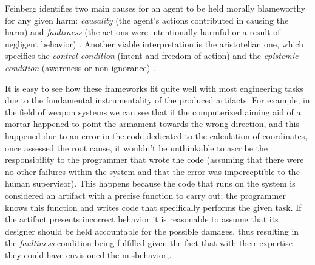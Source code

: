 Feinberg identifies two main causes for an agent to be held morally blameworthy for any given harm: \textit{causality} (the agent's actions contributed in causing the harm) and \textit{faultiness} (the actions were intentionally harmful or a result of negligent behavior) \parencite{FEISC}.
Another viable interpretation is the aristotelian one, which specifies the \textit{control condition} (intent and freedom of action) and the \textit{epistemic condition} (awareness or non-ignorance) \parencite{FISRAC}.

It is easy to see how these frameworks fit quite well with most engineering tasks due to the fundamental instrumentality of the produced artifacts.
For example, in the field of weapon systems we can see that if the computerized aiming aid of a mortar happened to point the armament towards the wrong direction, and this happened due to an error in the code dedicated to the calculation of coordinates, once assessed the root cause, it wouldn't be unthinkable to ascribe the responsibility to the programmer that wrote the code (assuming that there were no other failures within the system and that the error was imperceptible to the human supervisor).
This happens because the code that runs on the system is considered an artifact with a precise function to carry out; the programmer knows this function and writes code that specifically performs the given task.
If the artifact presents incorrect behavior it is reasonable to assume that its designer should be held accountable for the possible damages, thus resulting in the \textit{faultiness} condition being fulfilled given the fact that with their expertise they could have envisioned the misbehavior,.

